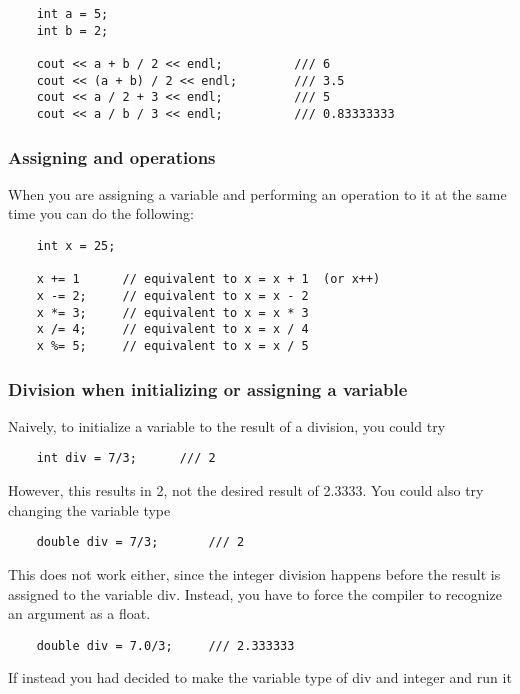 \documentclass[]{article}
\begin{document}
\begin{lstlisting}
	int a = 5;
	int b = 2;
	
	cout << a + b / 2 << endl;			/// 6
	cout << (a + b) / 2 << endl;		/// 3.5
	cout << a / 2 + 3 << endl;			/// 5
	cout << a / b / 3 << endl;			/// 0.83333333
\end{lstlisting}

\subsubsection{Assigning and operations}

When you are assigning a variable and performing an operation to it at the same time you can do the following:

\begin{lstlisting}
	int x = 25;
	
	x += 1		// equivalent to x = x + 1  (or x++)
	x -= 2;		// equivalent to x = x - 2
	x *= 3;		// equivalent to x = x * 3
	x /= 4;		// equivalent to x = x / 4
	x %= 5;		// equivalent to x = x / 5
\end{lstlisting}


\subsubsection{Division when initializing or assigning a variable}

Naively, to initialize a variable to the result of a division, you could try

\begin{lstlisting}
	int div = 7/3;		/// 2
\end{lstlisting}
\bigbreak

However, this results in 2, not the desired result of 2.3333. You could also try changing the variable type

\begin{lstlisting}
	double div = 7/3;		/// 2
\end{lstlisting}
\bigbreak

This does not work either, since the integer division happens before the result is assigned to the variable div. Instead, you have to force the compiler to recognize an argument as a float.

\begin{lstlisting}
	double div = 7.0/3;		/// 2.333333
\end{lstlisting}
\bigbreak

If instead you had decided to make the variable type of div and integer and run it
\end{document}
